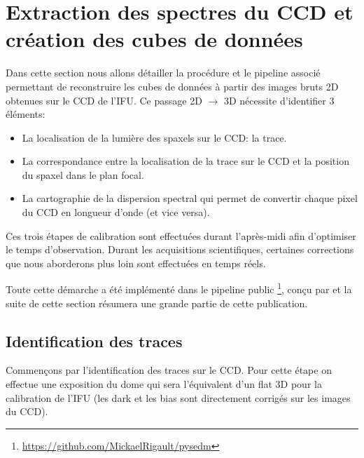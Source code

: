 \documentclass[../main/main.tex]{subfiles}
\begin{document}
\section{Extraction des spectres du CCD et création des cubes de données}
\label{sec:pysedmcube}

Dans cette section nous allons détailler la procédure et le pipeline
associé permettant de reconstruire les cubes de données à partir des
images bruts 2D obtenues sur le CCD de l'IFU. Ce passage 2D
$\rightarrow$ 3D nécessite d'identifier 3 éléments:

\begin{minipage}{\linewidth}
\begin{itemize}[label=$\diamondsuit$]
  \itemsep0em 
   \item La localisation de la lumière des spaxels sur le CCD: la trace.
   \item La correspondance entre la localisation de la trace sur le CCD et
     la position du spaxel dans le plan focal.
   \item La cartographie de la dispersion spectral qui permet de
     convertir chaque pixel du CCD en longueur d'onde (et vice versa).
\end{itemize}
\end{minipage}
\vspace{0.1cm}

Ces trois étapes de calibration sont
effectuées durant l'après-midi afin d'optimiser le temps
d'observation. Durant les acquisitions scientifiques, certaines corrections que nous
aborderons plus loin sont effectuées en temps réels.

Toute cette démarche a été implémenté dans le pipeline public
\pysedm\footnote{\url{https://github.com/MickaelRigault/pysedm}}, conçu
par \citet{pysedm} et la suite de cette section résumera une grande partie de cette
publication.
\subsection{Identification des traces}\label{ssec:tracematch}
Commençons par l'identification des traces sur le CCD. Pour cette
étape on effectue une exposition du dome qui sera l'équivalent d'un flat 3D
pour la calibration de l'IFU (les dark et les bias sont directement
corrigés sur les images du CCD).
\vspace{0.1cm}
\end{document}
